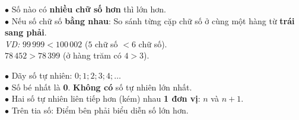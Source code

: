 \documentclass[14pt,a4paper,oneside]{extbook}
\begin{document}
\vspace{3mm}

\noindent
\begin{minipage}[t]{0.50\textwidth}
  \begin{tcolorbox}[
    enhanced,
    title={\footnotesize\bfseries\color{white}\faBalanceScale\ 2. So sánh hai số tự nhiên},
    colback=purple!2!white,
    colframe=purple!70!black,
    arc=2.5mm, boxrule=0.8pt, top=1.8mm, bottom=1.8mm, left=2.2mm, right=2.2mm
  ]
    \footnotesize
    $\bullet$ Số nào có \textbf{nhiều chữ số hơn} thì lớn hơn.\\
    $\bullet$ Nếu số chữ số \textbf{bằng nhau}: So sánh từng cặp chữ số ở cùng một hàng từ \textbf{trái sang phải}.\\
    \textit{VD:} $99\,999 < 100\,002$ ($5$ chữ số $< 6$ chữ số).\\
    $78\,452 > 78\,399$ (ở hàng trăm có $4 > 3$).
  \end{tcolorbox}
\end{minipage}%
\hfill
\begin{minipage}[t]{0.48\textwidth}
  \begin{tcolorbox}[
    enhanced,
    title={\footnotesize\bfseries\color{white}\faSortNumericAsc\ 3. Đặc điểm dãy số tự nhiên},
    colback=orange!2!white,
    colframe=orange!80!black,
    arc=2.5mm, boxrule=0.8pt, top=1.8mm, bottom=1.8mm, left=2mm, right=2mm
  ]
    \footnotesize
    $\bullet$ Dãy số tự nhiên: $0; 1; 2; 3; 4; \dots$\\
    $\bullet$ Số bé nhất là \textbf{0}. \textbf{Không có} số tự nhiên lớn nhất.\\
    $\bullet$ Hai số tự nhiên liên tiếp hơn (kém) nhau \textbf{1 đơn vị}: $n$ và $n + 1$.\\
    $\bullet$ Trên tia số: Điểm bên phải biểu diễn số lớn hơn.
  \end{tcolorbox}
\end{minipage}

\vspace{3mm}
\end{document}
